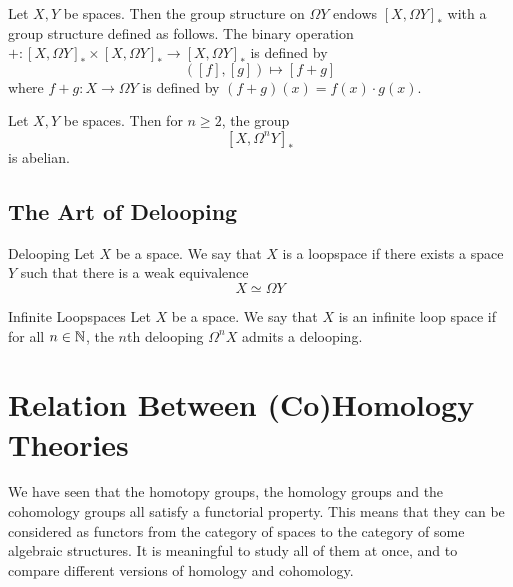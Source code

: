 \documentclass[a4paper]{article}
\begin{document}
\begin{prp}{}{} Let $X,Y$ be spaces. Then the group structure on $\Omega Y$ endows $[X,\Omega Y]_\ast$ with a group structure defined as follows. The binary operation $+:[X,\Omega Y]_\ast\times[X,\Omega Y]_\ast\to[X,\Omega Y]_\ast$ is defined by $$([f],[g])\mapsto[f+g]$$ where $f+g:X\to\Omega Y$ is defined by $(f+g)(x)=f(x)\cdot g(x)$. 
\end{prp}

\begin{prp}{}{} Let $X,Y$ be spaces. Then for $n\geq 2$, the group $$[X,\Omega^n Y]_\ast$$ is abelian. 
\end{prp}

\subsection{The Art of Delooping}
\begin{defn}{Delooping}{} Let $X$ be a space. We say that $X$ is a loopspace if there exists a space $Y$ such that there is a weak equivalence $$X\simeq\Omega Y$$
\end{defn}

\begin{defn}{Infinite Loopspaces}{} Let $X$ be a space. We say that $X$ is an infinite loop space if for all $n\in\mathbb{N}$, the $n$th delooping $\Omega^n X$ admits a delooping. 
\end{defn}

\pagebreak
\section{Relation Between (Co)Homology Theories}
We have seen that the homotopy groups, the homology groups and the cohomology groups all satisfy a functorial property. This means that they can be considered as functors from the category of spaces to the category of some algebraic structures. It is meaningful to study all of them at once, and to compare different versions of homology and cohomology. \\
\end{document}

